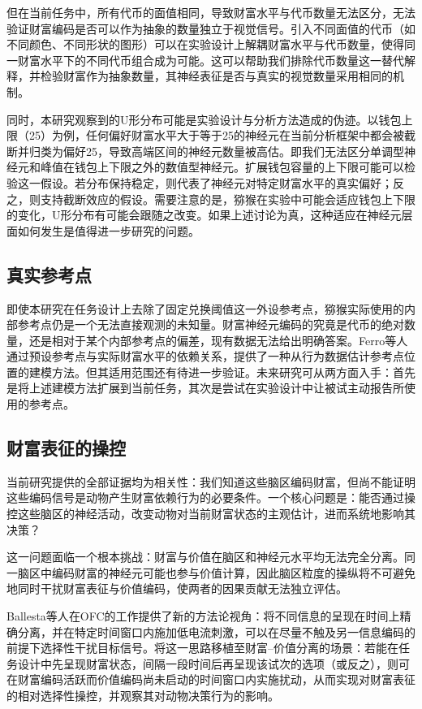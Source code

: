 但在当前任务中，所有代币的面值相同，导致财富水平与代币数量无法区分，无法验证财富编码是否可以作为抽象的数量独立于视觉信号。引入不同面值的代币（如不同颜色、不同形状的图形）可以在实验设计上解耦财富水平与代币数量，使得同一财富水平下的不同代币组合成为可能。这可以帮助我们排除代币数量这一替代解释，并检验财富作为抽象数量，其神经表征是否与真实的视觉数量采用相同的机制。

同时，本研究观察到的U形分布可能是实验设计与分析方法造成的伪迹。以钱包上限（25）为例，任何偏好财富水平大于等于25的神经元在当前分析框架中都会被截断并归类为偏好25，导致高端区间的神经元数量被高估。即我们无法区分单调型神经元和峰值在钱包上下限之外的数值型神经元。扩展钱包容量的上下限可能可以检验这一假设。若分布保持稳定，则代表了神经元对特定财富水平的真实偏好；反之，则支持截断效应的假设。需要注意的是，猕猴在实验中可能会适应钱包上下限的变化，U形分布有可能会跟随之改变。如果上述讨论为真，这种适应在神经元层面如何发生是值得进一步研究的问题。

\subsection{真实参考点}\label{chap4_2_5:reference_point}

即使本研究在任务设计上去除了固定兑换阈值这一外设参考点，猕猴实际使用的内部参考点仍是一个无法直接观测的未知量。财富神经元编码的究竟是代币的绝对数量，还是相对于某个内部参考点的偏差，现有数据无法给出明确答案。Ferro等人\citep{ferro2026accumulation}通过预设参考点与实际财富水平的依赖关系，提供了一种从行为数据估计参考点位置的建模方法。但其适用范围还有待进一步验证。未来研究可从两方面入手：首先是将上述建模方法扩展到当前任务，其次是尝试在实验设计中让被试主动报告所使用的参考点。

\subsection{财富表征的操控}\label{chap4_2_6:causal}

当前研究提供的全部证据均为相关性：我们知道这些脑区编码财富，但尚不能证明这些编码信号是动物产生财富依赖行为的必要条件。一个核心问题是：能否通过操控这些脑区的神经活动，改变动物对当前财富状态的主观估计，进而系统地影响其决策？

这一问题面临一个根本挑战：财富与价值在脑区和神经元水平均无法完全分离。同一脑区中编码财富的神经元可能也参与价值计算，因此脑区粒度的操纵将不可避免地同时干扰财富表征与价值编码，使两者的因果贡献无法独立评估。

Ballesta等人\citep{ballesta2020values,ballesta2022orbitofrontal}在OFC的工作提供了新的方法论视角：将不同信息的呈现在时间上精确分离，并在特定时间窗口内施加低电流刺激，可以在尽量不触及另一信息编码的前提下选择性干扰目标信号。将这一思路移植至财富–价值分离的场景：若能在任务设计中先呈现财富状态，间隔一段时间后再呈现该试次的选项（或反之），则可在财富编码活跃而价值编码尚未启动的时间窗口内实施扰动，从而实现对财富表征的相对选择性操控，并观察其对动物决策行为的影响。

